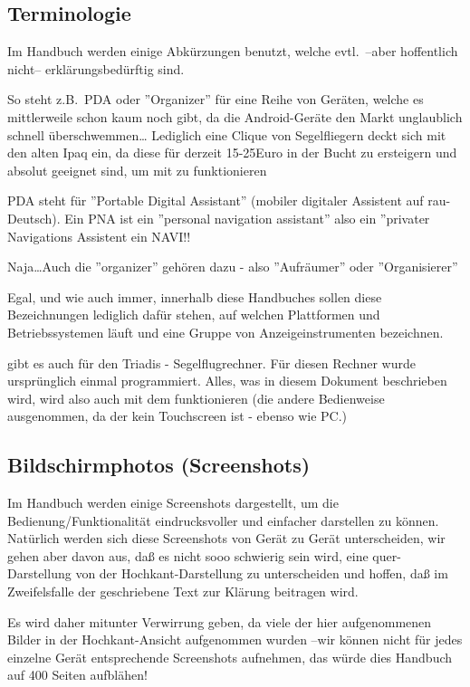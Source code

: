 \subsection*{Terminologie}
Im Handbuch werden einige Abkürzungen benutzt, welche evtl.\ --aber hoffentlich nicht--  erklärungsbedürftig sind.

So  steht z.B.\  PDA oder ''Organizer'' für eine Reihe von Geräten, welche es mittlerweile schon kaum noch 
gibt, da die Android-Geräte den Markt unglaublich schnell überschwemmen\dots  
{\small Lediglich eine Clique von Segelfliegern deckt sich mit den alten Ipaq ein, da diese für derzeit 15-25Euro in der Bucht 
zu ersteigern und absolut geeignet sind, um mit \xc zu funktionieren}

PDA steht für ''Portable Digital Assistant'' (mobiler digitaler Assistent auf rau-Deutsch). 
Ein PNA ist ein ''personal navigation assistant'' also ein ''privater Navigations Assistent ein NAVI!!

Naja\dots Auch die ''organizer'' gehören dazu - also ''Aufräumer'' oder ''Organisierer'' 
 
Egal, und wie auch immer, innerhalb diese Handbuches sollen diese Bezeichnungen lediglich dafür stehen, 
auf welchen Plattformen und Betriebssystemen \xc läuft und eine Gruppe von Anzeigeinstrumenten bezeichnen. 

\xc gibt es auch für den Triadis \al - Segelflugrechner. 
Für diesen Rechner wurde \xc ursprünglich einmal programmiert. Alles, was in diesem Dokument beschrieben wird, wird also auch 
mit dem \al funktionieren (die andere Bedienweise ausgenommen, da der \al kein Touchscreen ist - ebenso wie PC.)

\subsection*{Bildschirmphotos (Screenshots)}

Im Handbuch werden einige Screenshots dargestellt, um die Bedienung/Funktionalität eindrucksvoller und einfacher darstellen zu können.
Natürlich werden sich diese Screenshots von Gerät zu Gerät unterscheiden, wir gehen aber davon aus, daß es nicht sooo 
schwierig sein wird, eine quer-Darstellung  von der Hochkant-Darstellung zu unterscheiden und hoffen, daß im Zweifelsfalle der geschriebene
Text zur Klärung  beitragen wird. 

Es wird daher mitunter Verwirrung geben, da viele der hier aufgenommenen Bilder in der Hochkant-Ansicht aufgenommen wurden 
--wir können nicht für jedes einzelne Gerät entsprechende Screenshots aufnehmen, das würde dies Handbuch auf 400 Seiten aufblähen! 

